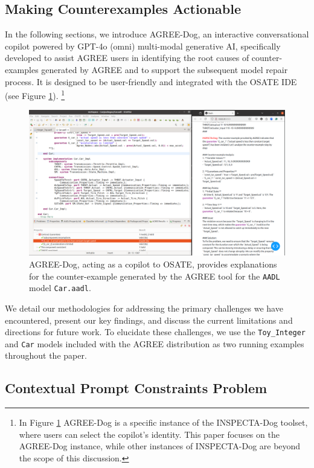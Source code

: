 \subsection{Making Counterexamples Actionable} 
In the following sections, we introduce AGREE-Dog, an interactive conversational copilot powered by GPT-4o (omni) multi-modal generative AI, specifically developed to assist AGREE users in identifying the root causes of counter-examples generated by AGREE and to support the subsequent model repair process. It is designed to be user-friendly and integrated with the OSATE IDE (see Figure \ref{fig:AGREEDOG}). \footnote{In Figure \ref{fig:AGREEDOG} AGREE-Dog is a specific instance of the INSPECTA-Dog toolset, where users can select the copilot's identity. This paper focuses on the AGREE-Dog instance, while other instances of INSPECTA-Dog are beyond the scope of this discussion.}

\begin{figure}[htbp]  
    \centering
    \includegraphics[width=\textwidth]{AGREE-DOG-high-rs.png}%
    \caption{AGREE-Dog, acting as a copilot to OSATE, provides explanations for the counter-example generated by the AGREE tool for the \texttt{AADL} model \texttt{Car.aadl}.}
    \label{fig:AGREEDOG}
\end{figure}


 We detail our methodologies for addressing the primary challenges we have encountered, present our key findings, and discuss the current limitations and directions for future work. To elucidate these challenges, we use the \texttt{Toy\_Integer} and \texttt{Car} models included with the AGREE distribution as two running examples throughout the paper.

\subsection{Contextual Prompt Constraints Problem}

